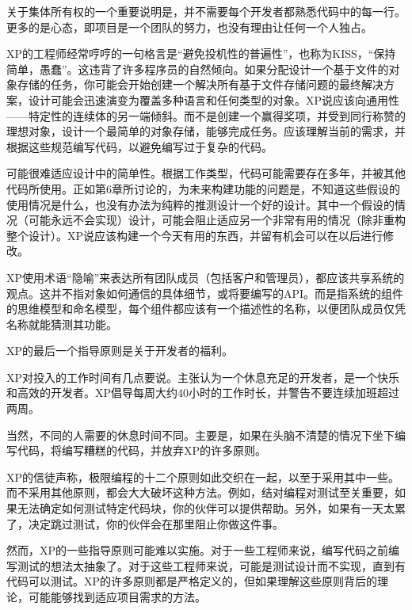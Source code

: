 关于集体所有权的一个重要说明是，并不需要每个开发者都熟悉代码中的每一行。更多的是心态，即项目是一个团队的努力，也没有理由让任何一个人独占。


XP的工程师经常哼哼的一句格言是“避免投机性的普遍性”，也称为KISS，“保持简单，愚蠢”。这违背了许多程序员的自然倾向。如果分配设计一个基于文件的对象存储的任务，你可能会开始创建一个解决所有基于文件存储问题的最终解决方案，设计可能会迅速演变为覆盖多种语言和任何类型的对象。XP说应该向通用性——特定性的连续体的另一端倾斜。而不是创建一个赢得奖项，并受到同行称赞的理想对象，设计一个最简单的对象存储，能够完成任务。应该理解当前的需求，并根据这些规范编写代码，以避免编写过于复杂的代码。

可能很难适应设计中的简单性。根据工作类型，代码可能需要存在多年，并被其他代码所使用。正如第6章所讨论的，为未来构建功能的问题是，不知道这些假设的使用情况是什么，也没有办法为纯粹的推测设计一个好的设计。其中一个假设的情况（可能永远不会实现）设计，可能会阻止适应另一个非常有用的情况（除非重构整个设计）。XP说应该构建一个今天有用的东西，并留有机会可以在以后进行修改。


XP使用术语“隐喻”来表达所有团队成员（包括客户和管理员），都应该共享系统的观点。这并不指对象如何通信的具体细节，或将要编写的API。而是指系统的组件的思维模型和命名模型，每个组件都应该有一个描述性的名称，以便团队成员仅凭名称就能猜测其功能。


XP的最后一个指导原则是关于开发者的福利。


XP对投入的工作时间有几点要说。主张认为一个休息充足的开发者，是一个快乐和高效的开发者。XP倡导每周大约40小时的工作时长，并警告不要连续加班超过两周。

当然，不同的人需要的休息时间不同。主要是，如果在头脑不清楚的情况下坐下编写代码，将编写糟糕的代码，并放弃XP的许多原则。


XP的信徒声称，极限编程的十二个原则如此交织在一起，以至于采用其中一些。而不采用其他原则，都会大大破坏这种方法。例如，结对编程对测试至关重要，如果无法确定如何测试特定代码块，你的伙伴可以提供帮助。另外，如果有一天太累了，决定跳过测试，你的伙伴会在那里阻止你做这件事。

然而，XP的一些指导原则可能难以实施。对于一些工程师来说，编写代码之前编写测试的想法太抽象了。对于这些工程师来说，可能是测试设计而不实现，直到有代码可以测试。XP的许多原则都是严格定义的，但如果理解这些原则背后的理论，可能能够找到适应项目需求的方法。

